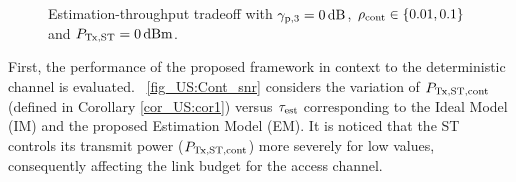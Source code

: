 \begin{figure}[!ht]
\vspace{-2mm}

\centering
{}
\caption{Estimation-throughput tradeoff with ${\gamma}_{\text{p,3}} = \SI{0}{dB}$, $\rho_{\text{cont}} \in \{0.01, 0.1\}$ and $P_{\text{Tx,ST}} = \SI{0}{dBm}$.}
\label{fig_US:ETT}
\end{figure}
First, the performance of the proposed framework in context to the deterministic channel is evaluated. \figurename~\ref{fig_US:Cont_snr} considers the variation of $P_{\text{Tx,ST,cont}}$ (defined in Corollary \ref{cor_US:cor1}) versus $\tau_{\text{est}}$ corresponding to the Ideal Model (IM) and the proposed Estimation Model (EM). It is noticed that the ST controls its transmit power ($P_{\text{Tx,ST,cont}}$) more severely for low values, consequently affecting the link budget for the access channel. %
